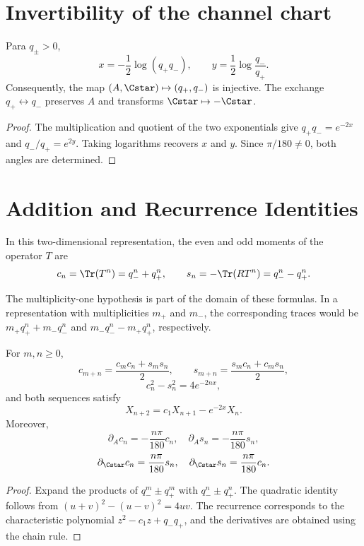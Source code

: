 \section{Invertibility of the channel chart}

\begin{theorem}
Para \(q_\pm>0\),
\[
 x=-\frac12\log(q_+q_-),
 \qquad
 y=\frac12\log\frac{q_-}{q_+}.
\]
Consequently, the map
\((A,\Cstar)\mapsto(q_+,q_-)\) is injective. The exchange
\(q_+\leftrightarrow q_-\) preserves \(A\) and transforms
\(\Cstar\mapsto-\Cstar\).
\end{theorem}
\begin{proof}
The multiplication and quotient of the two exponentials give
\(q_+q_-=e^{-2x}\) and \(q_-/q_+=e^{2y}\). Taking logarithms recovers
\(x\) and \(y\). Since \(\pi/180\neq0\), both angles are determined.
\end{proof}

\section{Addition and Recurrence Identities}

In this two-dimensional representation, the even and odd moments of the operator
\(T\) are
\[
 c_n=\Tr(T^n)=q_-^n+q_+^n,
 \qquad
 s_n=-\Tr(RT^n)=q_-^n-q_+^n.
\]

The multiplicity-one hypothesis is part of the domain of these formulas.
In a representation with multiplicities \(m_+\) and \(m_-\), the corresponding
traces would be
\(m_+q_+^n+m_-q_-^n\) and
\(m_-q_-^n-m_+q_+^n\), respectively.

\begin{theorem}
For \(m,n\geq0\),
\[
 c_{m+n}=\frac{c_mc_n+s_ms_n}{2},
 \qquad
 s_{m+n}=\frac{s_mc_n+c_ms_n}{2},
\]
\[
 c_n^2-s_n^2=4e^{-2nx},
\]
and both sequences satisfy
\[
 X_{n+2}=c_1X_{n+1}-e^{-2x}X_n.
\]
Moreover,
\[
 \partial_Ac_n=-\frac{n\pi}{180}c_n,
 \quad
 \partial_As_n=-\frac{n\pi}{180}s_n,
\]
\[
 \partial_{\Cstar}c_n=\frac{n\pi}{180}s_n,
 \quad
 \partial_{\Cstar}s_n=\frac{n\pi}{180}c_n.
\]
\end{theorem}
\begin{proof}
Expand the products of
\(q_-^m\pm q_+^m\) with \(q_-^n\pm q_+^n\). The quadratic identity follows
from \((u+v)^2-(u-v)^2=4uv\). The recurrence corresponds to the characteristic
polynomial \(z^2-c_1z+q_-q_+\), and the derivatives are obtained using the
chain rule.
\end{proof}

